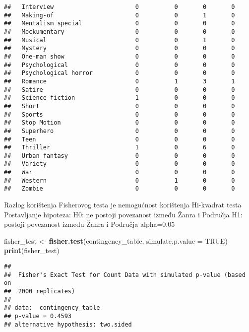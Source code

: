 \documentclass[
]{article}
\newenvironment{Shaded}{\begin{snugshade}}{\end{snugshade}}
\newcommand{\AttributeTok}[1]{\textcolor[rgb]{0.13,0.29,0.53}{#1}}
\newcommand{\ConstantTok}[1]{\textcolor[rgb]{0.56,0.35,0.01}{#1}}
\newcommand{\FunctionTok}[1]{\textcolor[rgb]{0.13,0.29,0.53}{\textbf{#1}}}
\newcommand{\NormalTok}[1]{#1}
\newcommand{\OtherTok}[1]{\textcolor[rgb]{0.56,0.35,0.01}{#1}}
\begin{document}
\begin{verbatim}
##   Interview                       0          0       0       0
##   Making-of                       0          0       1       0
##   Mentalism special               0          0       0       0
##   Mockumentary                    0          0       0       0
##   Musical                         0          0       1       0
##   Mystery                         0          0       0       0
##   One-man show                    0          0       0       0
##   Psychological                   0          0       0       0
##   Psychological horror            0          0       0       0
##   Romance                         0          1       3       1
##   Satire                          0          0       0       0
##   Science fiction                 1          0       0       0
##   Short                           0          0       0       0
##   Sports                          0          0       0       0
##   Stop Motion                     0          0       0       0
##   Superhero                       0          0       0       0
##   Teen                            0          0       0       0
##   Thriller                        1          0       6       0
##   Urban fantasy                   0          0       0       0
##   Variety                         0          0       0       0
##   War                             0          0       0       0
##   Western                         0          1       0       0
##   Zombie                          0          0       0       0
\end{verbatim}

Razlog korištenja Fisherovog testa je nemogućnost korištenja Hi-kvadrat
testa Postavljanje hipoteza: H0: ne postoji povezanost između Žanra i
Područja H1: postoji povezanost između Žanra i Područja alpha=0.05

\begin{Shaded}
\begin{Highlighting}[]
\NormalTok{fisher\_test }\OtherTok{\textless{}{-}} \FunctionTok{fisher.test}\NormalTok{(contingency\_table, }\AttributeTok{simulate.p.value =} \ConstantTok{TRUE}\NormalTok{)}
\FunctionTok{print}\NormalTok{(fisher\_test)}
\end{Highlighting}
\end{Shaded}

\begin{verbatim}
## 
##  Fisher's Exact Test for Count Data with simulated p-value (based on
##  2000 replicates)
## 
## data:  contingency_table
## p-value = 0.4593
## alternative hypothesis: two.sided
\end{verbatim}
\end{document}
